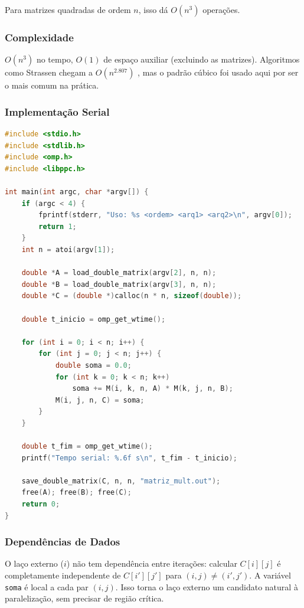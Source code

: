 \documentclass[12pt]{article}
\begin{document}
Para matrizes quadradas de ordem $n$, isso dá $O(n^3)$ operações.

\subsubsection{Complexidade}

$O(n^3)$ no tempo, $O(1)$ de espaço auxiliar (excluindo as matrizes). Algoritmos como Strassen chegam a $O(n^{2.807})$ \cite{strassen1969}, mas o padrão cúbico foi usado aqui por ser o mais comum na prática.

\subsubsection{Implementação Serial}

\begin{lstlisting}[language=C, caption={Multiplicação matricial serial}]
#include <stdio.h>
#include <stdlib.h>
#include <omp.h>
#include <libppc.h>

int main(int argc, char *argv[]) {
    if (argc < 4) {
        fprintf(stderr, "Uso: %s <ordem> <arq1> <arq2>\n", argv[0]);
        return 1;
    }
    int n = atoi(argv[1]);

    double *A = load_double_matrix(argv[2], n, n);
    double *B = load_double_matrix(argv[3], n, n);
    double *C = (double *)calloc(n * n, sizeof(double));

    double t_inicio = omp_get_wtime();

    for (int i = 0; i < n; i++) {
        for (int j = 0; j < n; j++) {
            double soma = 0.0;
            for (int k = 0; k < n; k++)
                soma += M(i, k, n, A) * M(k, j, n, B);
            M(i, j, n, C) = soma;
        }
    }

    double t_fim = omp_get_wtime();
    printf("Tempo serial: %.6f s\n", t_fim - t_inicio);

    save_double_matrix(C, n, n, "matriz_mult.out");
    free(A); free(B); free(C);
    return 0;
}
\end{lstlisting}

\subsubsection{Dependências de Dados}

O laço externo ($i$) não tem dependência entre iterações: calcular $C[i][j]$ é completamente independente de $C[i'][j']$ para $(i,j) \neq (i',j')$. A variável \texttt{soma} é local a cada par $(i,j)$. Isso torna o laço externo um candidato natural à paralelização, sem precisar de região crítica.
\end{document}
